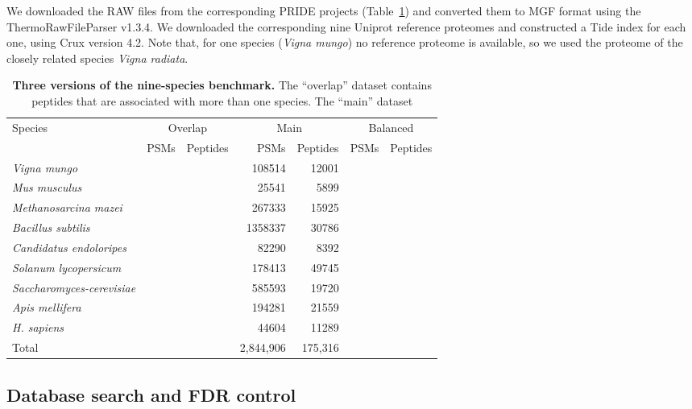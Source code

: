 \documentclass{article}
\newcommand{\fixme}[1]{{\color{red}{\bf FIXME: #1}\color{black}}}
\begin{document}

We downloaded the RAW files from the corresponding PRIDE projects (Table~\ref{tab:benchmark}) and converted them to MGF format using the ThermoRawFileParser v1.3.4.
We downloaded the corresponding nine Uniprot reference proteomes and constructed a Tide index for each one, using Crux version 4.2.
Note that, for one species (\textit{Vigna mungo}) no reference proteome is available, so we used the proteome of the closely related species \textit{Vigna radiata}.

\begin{table}
\scriptsize
\centering
\begin{tabular}{lrrrrrr}
\hline
Species & \multicolumn{2}{c}{Overlap} & \multicolumn{2}{c}{Main} & \multicolumn{2}{c}{Balanced} \\
& PSMs & Peptides  & PSMs & Peptides  & PSMs & Peptides  \\
\hline
\textit{Vigna mungo} & & & 108514 & 12001 \\
\textit{Mus musculus} & & & 25541 & 5899 \\
\textit{Methanosarcina mazei} & & & 267333 & 15925 \\
\textit{Bacillus subtilis} & & & 1358337 & 30786 \\
\textit{Candidatus endoloripes} & & & 82290 & 8392 \\
\textit{Solanum lycopersicum} & & & 178413 & 49745 \\
\textit{Saccharomyces-cerevisiae} & & & 585593 & 19720 \\
\textit{Apis mellifera} & & & 194281 & 21559 \\
\textit{H. sapiens} & & & 44604 & 11289 \\
\hline
Total & & & 2,844,906 & 175,316 \\
\end{tabular}
\caption{{\bf Three versions of the nine-species benchmark.}
  The ``overlap'' dataset contains peptides that are associated with more than one species.
  The ``main'' dataset \fixme{XXX}
}
\label{tab:benchmark}
\end{table}

\subsection*{Database search and FDR control}
\end{document}
